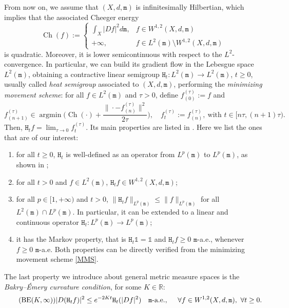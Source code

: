 \documentclass[10pt,leqno]{amsart}
\numberwithin{equation}{section}
\newcommand{\R}{\mathbb{R}}
\newcommand{\ttm}{\mathtt{m}}
\begin{document}
From now on, we assume that $(X,d,\ttm)$ is infinitesimally Hilbertian, which implies that the associated Cheeger energy 
\[\operatorname{Ch}(f) := \begin{cases}
\int_{X} |Df|^2 d\ttm, & f \in W^{1,2}(X,d,\ttm)
\\
+\infty, & f\in L^2(\ttm)\setminus W^{1,2}(X,d,\ttm)
\end{cases}\]
is quadratic. Moreover, it is lower semicontinuous with respect to the $L^2$-convergence. In particular, we can build its gradient flow in the Lebesgue space $L^2(\ttm)$, obtaining a contractive linear semigroup $\mathtt{H}_t:L^2(\ttm) \to L^2(\ttm)$, $t\geq 0$, usually called \textit{heat semigroup} associated to $(X,d,\ttm)$, performing the \textit{minimizing movement scheme}: for all $f\in L^2(\ttm)$ and $\tau>0$, define $f^{(\tau)}_{(0)} := f$ and
\begin{equation}\label{MMS}
    f^{(\tau)}_{(n+1)} \in \operatorname{argmin} \bigg( \operatorname{Ch}(\cdot) + \frac{\|\cdot - f^{(\tau)}_{(n)} \|^2}{2\tau} \bigg), \quad f^{(\tau)}_t := f^{(\tau)}_{(n)}, \ \text{with } t\in[n\tau, (n+1)\tau).
\end{equation}
Then, $\mathtt{H}_t f = \lim_{\tau\to 0} f^{(\tau)}_t$.
Its main properties are listed in \cite[Theorem 5.1.12]{gigli2020lectures}. Here we list the ones that are of our interest:
\begin{enumerate}
    \item for all $t\geq 0$, $\mathtt{H}_t$ is well-defined as an operator from $L^p(\ttm)$ to $L^p(\ttm)$, as shown in \cite[Proposition 5.2.15]{gigli2020lectures};
    \item for all $t>0$ and $f\in L^2(\ttm)$, $\mathtt{H}_t f \in W^{1,2}(X,d,\ttm)$;
    \item for all $p\in[1,+\infty)$ and $t>0$, $\|\mathtt{H}_t f\|_{L^p(\ttm)} \leq \|f\|_{L^p(\ttm)}$ for all $L^2(\ttm)\cap L^p(\ttm)$. In particular, it can be extended to a linear and continuous operator $\mathtt{H}_t:L^p(\ttm) \to L^p(\ttm)$;
    \item it has the Markov property, that is $\mathtt{H}_t \mathds{1} = \mathds{1}$ and $\mathtt{H}_t f \geq 0$ $\ttm$-a.e., whenever $f\geq 0$ $\ttm$-a.e. Both properties can be directly verified from the minimizing movement scheme \eqref{MMS}.
\end{enumerate}

The last property we introduce about general metric measure spaces is the \textit{Bakry--\'Emery curvature condition}, for some $K\in \R$: 
\begin{equation}\label{eq: BE}\tag{$\operatorname{BE}(K,\infty)$}
   |D(\mathtt{H}_t f)|^2 \leq e^{-2Kt} \mathtt{H}_t(|Df|^2) \quad \ttm\text{-a.e.}, \quad \  \forall f\in W^{1,2}(X,d,\ttm), \ \forall t\geq 0.
\end{equation}
\end{document}
